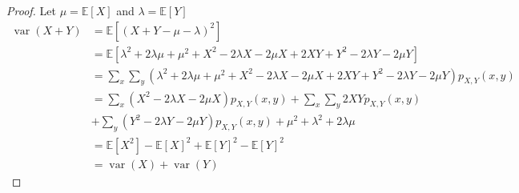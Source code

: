 \documentclass[fontsize=10pt]{article}
\numberwithin{equation}{subsection}
\newcommand{\EE}[1]{\mathbb{E}\left[#1\right]}
\newcommand{\var}{\mathop{\mathrm{var}}}
\begin{document}
\begin{itemize*}
\begin{proof}Let $\mu=\EE X$ and $\lambda=\EE Y$
\begin{align*}
\var(X+Y)&=\EE{(X+Y-\mu-\lambda)^2}\\
&=\EE{\lambda ^2+2 \lambda  \mu +\mu ^2+X^2-2 \lambda  X-2 \mu  X+2 X Y+Y^2-2 \lambda  Y-2 \mu  Y}\\
&=\sum_x\sum_y\left(\lambda ^2+2 \lambda  \mu +\mu ^2+X^2-2 \lambda  X-2 \mu  X+2 X Y+Y^2-2 \lambda  Y-2 \mu  Y\right)p_{X,Y}(x,y)\\
&=\sum_x\left(X^2 - 2\lambda X-2 \mu  X\right)p_{X,Y}(x,y)+\sum_x\sum_y2 X Yp_{X,Y}(x,y)\\&+\sum_y\left(Y^2-2 \lambda  Y-2 \mu  Y\right)p_{X,Y}(x,y)+\mu^2+\lambda^2+2\lambda\mu\\
&=\EE{X^2}-\EE X^2+\EE {Y}^2-\EE Y^2\\
&=\var(X)+\var(Y)
\end{align*}
\end{proof}
\end{itemize*}
\end{document}
